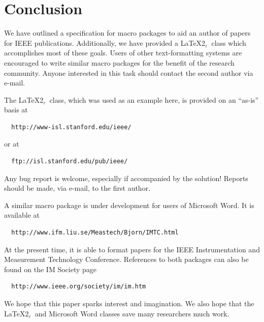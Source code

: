 \documentclass[%
	final,
	notitlepage,
	narroweqnarray,
	inline,
	twoside,
	]{ieee}
\newcommand{\latexiie}{\LaTeX2{\Large$_\varepsilon$}}
\begin{document}
\section{Conclusion}

We have outlined a specification for macro packages to aid an author
of papers for IEEE publications. Additionally, we have provided a
\latexiie\ class which accomplishes most of these goals. Users of other
text-formatting systems are encouraged to write similar macro packages
for the benefit of the research community. Anyone interested in this 
task should contact the second author via e-mail.

The \latexiie\ class, which was used as an example here,
is provided on an ``as-is'' basis at

\begin{verbatim}
  http://www-isl.stanford.edu/ieee/
\end{verbatim}

\noindent or at

\begin{verbatim}
  ftp://isl.stanford.edu/pub/ieee/
\end{verbatim}

\noindent Any bug report is welcome, especially if accompanied by the solution!
Reports should be made, via e-mail, to the first author.

A similar macro package is under development for users of Microsoft Word. 
It is available at 

\begin{verbatim}
  http://www.ifm.liu.se/Meastech/Bjorn/IMTC.html
\end{verbatim}

\noindent At the present time, it is able to format papers for the IEEE
Instrumentation and Measurement Technology Conference. 
References to both packages can also be found on the IM Society page 

\begin{verbatim}
  http://www.ieee.org/society/im/im.htm
\end{verbatim}

We hope that this paper sparks interest and imagination. We also hope
that the \latexiie\ and Microsoft Word classes save many researchers much work.
\end{document}
